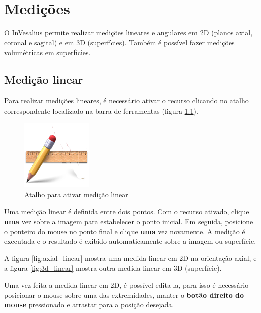 \chapter{Medições}

O InVesalius permite realizar medições lineares e angulares em 2D (planos axial,
coronal e sagital) e em 3D (superfícies). Também é possível fazer medições
volumétricas em superfícies.

\section{Medição linear}

Para realizar medições lineares, é necessário ativar o recurso clicando no atalho
correspondente localizado na barra de ferramentas (figura \ref{fig:measure_line_original}).

\begin{figure}[!htb]
\centering
\includegraphics[scale=0.2]{../user_guide_figures/icons/measure_line_original.png}
\caption{Atalho para ativar medição linear}
\label{fig:measure_line_original}
\end{figure}

Uma medição linear é definida entre dois pontos. Com o recurso ativado, clique
\textbf{uma} vez sobre a imagem para estabelecer o ponto inicial. Em seguida,
posicione o ponteiro do mouse no ponto final e clique \textbf{uma} vez novamente.
A medição é executada e o resultado é exibido automaticamente sobre a imagem ou
superfície.

A figura \ref{fig:axial_linear} mostra uma medida linear em 2D na orientação axial,
e a figura \ref{fig:3d_linear} mostra outra medida linear em 3D (superfície).

Uma vez feita a medida linear em 2D, é possível edita-la, para isso é necessário posicionar o mouse sobre uma das extremidades, manter o \textbf{botão direito do mouse} pressionado e arrastar para a posição desejada.

